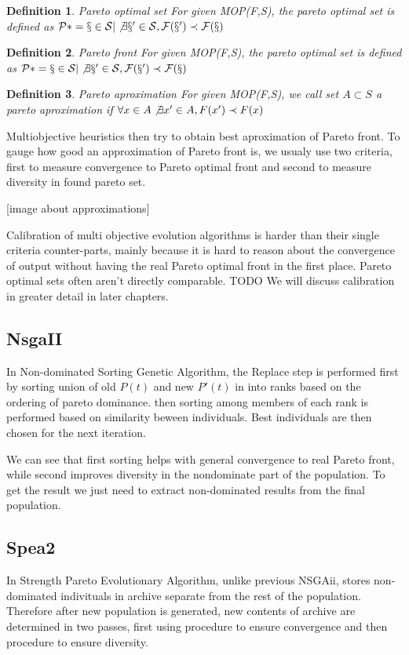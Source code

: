 \documentclass[12pt,oneside,draft]{fithesis2}
\newtheorem{defn}{Definition}
\begin{document}
\begin{defn}{Pareto optimal set}
  For given MOP(F,S), the pareto optimal set is defined as $\cal
P* = {x \in S | \not \exists x' \in S, F(x') \prec F(x)}$
\end{defn}

\begin{defn}{Pareto front}
  For given MOP(F,S), the pareto optimal set is defined as $\cal
P* = {x \in S | \not \exists x' \in S, F(x') \prec F(x)} $
\end{defn}

\begin{defn}{Pareto aproximation}
  For given MOP(F,S), we call set $A \subset S$ a  pareto aproximation if $\forall x \in A \not \exists x' \in A, F(x') \prec F(x)$
\end{defn}

Multiobjective heuristics then try to obtain best aproximation of Pareto front. To gauge how good an approximation of Pareto front is, we usualy use two criteria, first to measure convergence to Pareto optimal front and second to measure diversity in found pareto set.

[image about approximations]

Calibration of multi objective evolution algorithms is harder than their single criteria counter-parts, mainly because it is hard to reason about the convergence of output without having the real Pareto optimal front in the first place. Pareto optimal sets often aren't directly comparable. TODO We will discuss calibration in greater detail in later chapters.


\subsection{NsgaII}
In Non-dominated Sorting Genetic Algorithm, the Replace step is performed
first by sorting union of old $P(t)$ and new $P'(t)$ in into ranks based on the ordering of pareto dominance.
then sorting among members of each rank is performed based on similarity beween individuals. Best individuals are then chosen for the next iteration.

We can see that first sorting helps with general convergence to real Pareto front, while second improves diversity in the nondominate part of the population.
To get the result we just need to extract non-dominated results from the final population. 

\subsection{Spea2}
In Strength Pareto Evolutionary Algorithm, unlike previous NSGAii, stores non-dominated indivituals in archive separate from the rest of the population. Therefore after new population is generated, new contents of archive are determined in two passes, first using procedure to ensure convergence and then procedure to ensure diversity.
\end{document}
